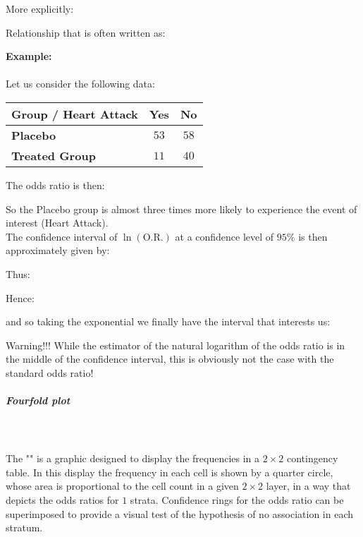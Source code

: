 	More explicitly:
	
	Relationship that is often written as:
	
	\begin{tcolorbox}[colframe=black,colback=white,sharp corners]
	\textbf{{\Large {}}Example:}\\\\
	Let us consider the following data:
	\begin{table}[H]
		\centering
		\begin{tabular}{|l|c|c|}
		\hline
		 Group / Heart Attack & \multicolumn{1}{l|}{\cellcolor[HTML]{9B9B9B}\textbf{Yes}} & \multicolumn{1}{l|}{\cellcolor[HTML]{9B9B9B}\textbf{No}} \\ \hline
		\cellcolor[HTML]{9B9B9B}\textbf{Placebo} & $53$ & $58$ \\ \hline
		\cellcolor[HTML]{9B9B9B}\textbf{Treated Group} & $11$ & $40$ \\ \hline
		\end{tabular}
	\end{table}
	The odds ratio is then:
	
	So the Placebo group is almost three times more likely to experience the event of interest (Heart Attack).\\
	
	The confidence interval of $\ln(\text{O.R.})$ at a confidence level of $95\%$ is then
approximately given by:
	
	Thus:
	
	Hence:
	
	and so taking the exponential we finally have the interval that interests us:
	
	\end{tcolorbox}
	Warning!!! While the estimator of the natural logarithm of the odds ratio is in the middle of the confidence interval, this is obviously not the case with the standard odds ratio!
	
	\subparagraph{Fourfold plot}\mbox{}\\\\
	The "" is a graphic designed to display the frequencies in a $2\times 2$ contingency table. In this display the frequency in each cell is shown by a quarter circle, whose area is proportional to the cell count in a given $2\times 2$ layer, in a way that depicts the odds ratios for $1$ strata. Confidence rings for the odds ratio can be superimposed to provide a visual test of the hypothesis of no association in each stratum.
	
